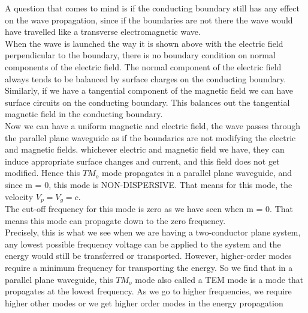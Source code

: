 A question that comes to mind is if the conducting boundary still has any effect on the wave propagation, since if the boundaries are not there the wave would have travelled like a transverse electromagnetic wave.\\
When the wave is launched the way it is shown above with the electric field perpendicular to the boundary, there is no boundary condition on normal components of the electric field. The normal component of the electric field always tends to be balanced by surface charges on the conducting boundary.\\ Similarly, if we have a tangential component of the magnetic field we can have surface circuits on the conducting boundary. This balances out the tangential magnetic field in the conducting boundary.\\
Now we can have a uniform magnetic and electric field, the wave passes through the parallel plane waveguide as if the boundaries are not modifying the electric and magnetic fields. whichever electric and magnetic field we have, they can induce appropriate surface changes and current, and this field does not get modified. Hence this $TM_o$ mode propagates in a parallel plane waveguide, and since m = 0, this mode is NON-DISPERSIVE. That means for this mode, the velocity $V_{p}=V_{g}=c$.\\
The cut-off frequency for this mode is zero as we have seen when m = 0. That means this mode can propagate down to the zero frequency.\\
Precisely, this is what we see when we are having a two-conductor plane system, any lowest possible frequency voltage can be applied to the system and the energy would still be transferred or transported. However, higher-order modes require a minimum frequency for transporting the energy. So we find that in a parallel plane waveguide, this $TM_o$ mode also called a TEM mode is a mode that propagates at the lowest frequency. As we go to higher frequencies, we require higher other modes or we get higher order modes in the energy propagation\\

